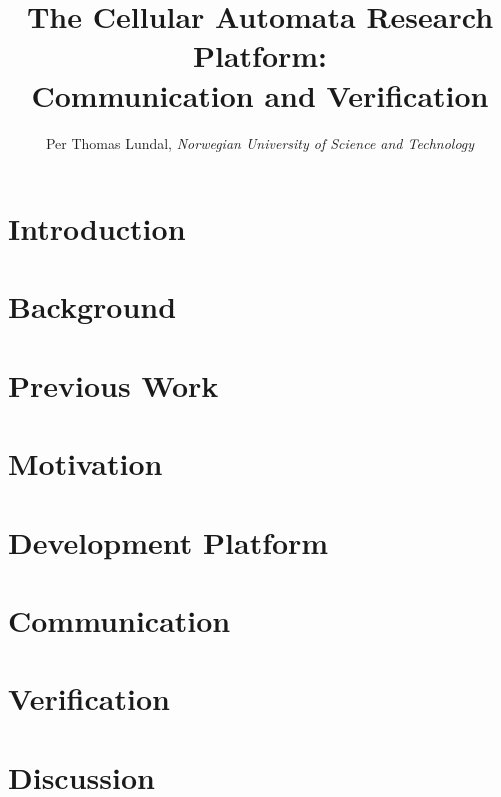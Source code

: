 \documentclass[a4paper]{IEEEtran}
\title{The Cellular Automata Research Platform: \\ Communication and Verification}
\author{Per Thomas Lundal, \emph{Norwegian University of Science and Technology}}
\begin{document}
\maketitle

\begin{abstract}

    

\end{abstract}

\section{Introduction}

    

\section{Background}
    \label{sec:background}
    

\section{Previous Work}
    \label{sec:previous-work}
    

\section{Motivation}
    \label{sec:motivation}
    

\section{Development Platform}
    \label{sec:development}
    

\section{Communication}
    \label{sec:communication}
    

\section{Verification}
    \label{sec:verification}
    

\section{Discussion}
    \label{sec:discussion}
    
\end{document}
